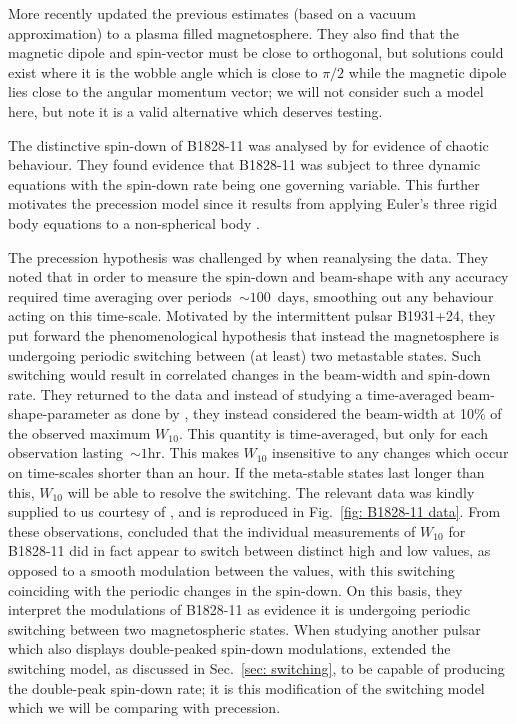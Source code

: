 \documentclass[../full_thesis/full_thesis.tex]{subfiles}
\begin{document}
More recently \citet{Arzamasskiy2015} updated the previous estimates (based on
a vacuum approximation) to a plasma filled magnetosphere. They also find that
the magnetic dipole and spin-vector must be close to orthogonal, but solutions
could exist where it is the wobble angle which is close to $\pi/2$ while the
magnetic dipole lies close to the angular momentum vector; we will not consider
such a model here, but note it is a valid alternative which deserves testing.

The distinctive spin-down of B1828-11 was analysed by \citet{Seymour2013} for
evidence of chaotic behaviour. They found evidence that B1828-11 was subject to
three dynamic equations with the spin-down rate being one governing variable.
This further motivates the precession model since it results from applying
Euler's three rigid body equations to a non-spherical body \citep{Landau1969}.

The precession hypothesis was challenged by \citet{Lyne2010} when reanalysing
the data.   They noted that in order to measure the spin-down and beam-shape
with any accuracy required time averaging over periods~$\sim100$~days,
smoothing out any behaviour acting on this time-scale. Motivated by the
intermittent pulsar B1931+24, they put forward the phenomenological hypothesis
that instead the magnetosphere is undergoing periodic switching between (at
least) two metastable states. Such switching would result in correlated changes
in the beam-width and spin-down rate. They returned to the data and instead of
studying a time-averaged beam-shape-parameter as done by \citet{Stairs2000},
they instead considered the beam-width at 10\% of the observed maximum
$W_{10}$. This quantity is time-averaged, but only for each observation
lasting~$\sim1$hr. This makes $W_{10}$ insensitive to any changes which occur on
time-scales shorter than an hour. If the meta-stable states last longer than
this, $W_{10}$ will be able to resolve the switching. The  relevant data was
kindly supplied to us courtesy of \citet{Lyne2010}, and is reproduced in
Fig.~\ref{fig: B1828-11 data}. From these observations,
\citet{Lyne2010} concluded that the individual measurements of $W_{10}$ for
B1828-11 did in fact appear to switch between distinct high and low values, as
opposed to a smooth modulation between the values, with this switching
coinciding with the periodic changes in the spin-down. On this basis, they
interpret the modulations of B1828-11 as evidence it is undergoing periodic
switching between two magnetospheric states. When studying another pulsar which
also displays double-peaked spin-down modulations, \citet{Perera2015} extended
the switching model, as discussed in Sec.~\ref{sec: switching}, to be capable
of producing the double-peak spin-down rate; it is this modification of the
switching model which we will be comparing with precession.
\end{document}
